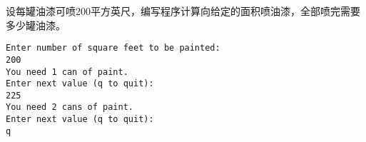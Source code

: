 \begin{frame}[fragile]\ft{\secname}
\begin{li}
设每罐油漆可喷200平方英尺，编写程序计算向给定的面积喷油漆，全部喷完需要多少罐油漆。
\end{li}
\end{frame}

\begin{frame}[fragile]\ft{\secname}


\end{frame}

\begin{frame}[fragile]\ft{\secname}
\begin{lstlisting}[backgroundcolor=\color{blue!20}]
Enter number of square feet to be painted:
200
You need 1 can of paint.
Enter next value (q to quit):
225
You need 2 cans of paint.
Enter next value (q to quit):
q
\end{lstlisting}
\end{frame}


